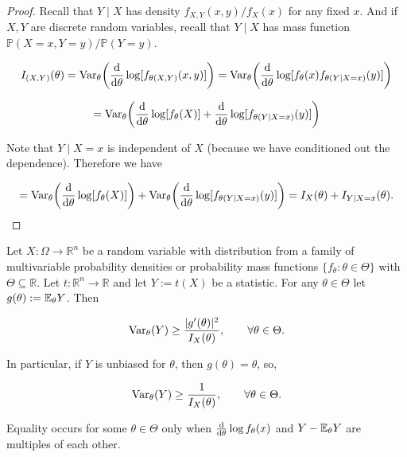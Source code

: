 \begin{proof}Recall that \(Y \mid X\) has density \(f_{X,Y}(x,y)/f_X(x)\) for any fixed \(x\). And if \(X, Y\) are discrete random variables, recall that \(Y\mid X\) has mass function \(\mathbb{P}(X=x, Y=y) /\mathbb{P}(Y=y)\).

\[
I_{(X,Y)}(\theta) = \Var_\theta \bigg( \deriv{}{\theta} \log [f_{\theta(X, Y)} (x,y)] \bigg)   = \Var_\theta \bigg( \deriv{}{\theta} \log [f_{\theta} (x) f_{\theta(Y \mid X=x)} (y)] \bigg)  
\]


\[
 = \Var_\theta \bigg( \deriv{}{\theta} \log [f_\theta(X) ] +  \deriv{}{\theta}  \log[  f_{\theta(Y \mid X=x)} (y)] \bigg)  
\]

Note that \(Y \mid X =x\) is independent of \(X\) (because we have conditioned out the dependence). Therefore we have

\[
 = \Var_\theta \bigg( \deriv{}{\theta} \log [f_\theta(X) ] \bigg) +  \Var_\theta \bigg( \deriv{}{\theta}  \log[ f_{\theta(Y \mid X=x)} (y)] \bigg)  = I_X(\theta) + I_{Y \mid X = x}(\theta).
 \]


% 
% 

\end{proof}

\begin{theorem}\label{mathstats.cramer.rao} Let \(X: \Omega \to \mathbb{R}^n\) be a random variable with distribution from a family of multivariable probability densities or probability mass functions \(\{f_\theta: \theta \in \Theta\}\) with \(\Theta \subseteq \mathbb{R}\). Let \(t: \mathbb{R}^n \to \mathbb{R}\) and let \(Y:= t(X)\) be a statistic. For any \(\theta \in \Theta\) let \(g(\theta) := \E_\theta Y\). Then

\[
\Var_\theta(Y) \geq \frac{ |g'(\theta)|^2}{I_X(\theta)}, \qquad \forall \theta \in \Theta.
\]

In particular, if \(Y\) is unbiased for \(\theta\), then \(g(\theta) = \theta\), so,

\[
\Var_\theta(Y) \geq \frac{ 1}{I_X(\theta)}, \qquad \forall \theta \in \Theta.
\]

Equality occurs for some \(\theta \in \Theta\) only when \(\deriv{}{\theta} \log f_\theta(x) \) and \(Y - \E_\theta Y\) are multiples of each other. 

\end{theorem}

